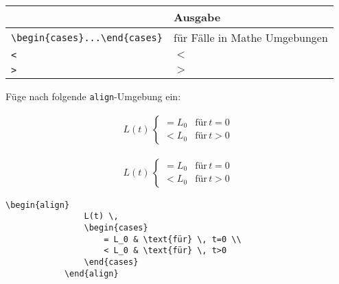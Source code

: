 \documentclass["WS\space 16-17\space -\space LaTeX-Kurs\space -\space Praesentation\space -\space 1.tex"]{subfiles}
\begin{document}
\begin{frame}[fragile]
	\begin{center}
		\begin{tabular}{ll}
			\toprule
			\color{math-cmd}{Mathe}\color{black}{-Befehl}									&	Ausgabe		\\ \midrule
			\lstinline|\begin{cases}...\end{cases}|	&	für Fälle in Mathe Umgebungen	\\
			\lstinline|<|							&	$<$		\\
			\lstinline|>|							&	$>$		\\
			\bottomrule
		\end{tabular}
	\end{center}
	\pause\btVFill
	\Aufgabee
		Füge nach  folgende \lstinline[basicstyle=\normalfont\normalsize]|align|-Umgebung ein:
		\begin{outputbox}
		    \begin{align}
		      L(t) \,
		      \begin{cases}
		        = L_0 & \text{für} \, t=0 \\
		        < L_0 & \text{für} \, t>0
		      \end{cases} \tag{X}
		    \end{align}
	    \end{outputbox}
	\vspace{0.3cm}
\end{frame}
\begin{frame}[fragile]
	\Losung
		\begin{outputbox}
		    \begin{align}
				L(t) \,
				\begin{cases}
					= L_0 & \text{für} \, t=0 \\
					< L_0 & \text{für} \, t>0
				\end{cases} \tag{X}
		    \end{align}
		\end{outputbox}
	\Code
		\begin{lstlisting}[gobble=12]
			\begin{align}
				L(t) \,
				\begin{cases}
					= L_0 & \text{für} \, t=0 \\
					< L_0 & \text{für} \, t>0
				\end{cases}
			\end{align}
		\end{lstlisting}
\end{frame}
\end{document}
